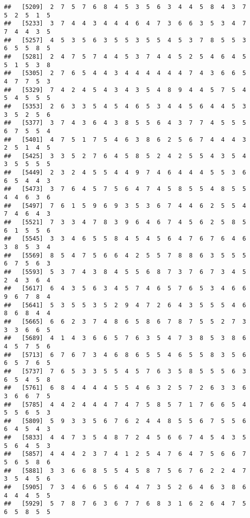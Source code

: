 \documentclass[
]{book}
\begin{document}
\begin{verbatim}
##   [5209]  2  7  5  7  6  8  4  5  3  5  6  3  4  4  5  8  4  3  7  5  2  5  1  5
##   [5233]  3  7  4  4  3  4  4  4  6  4  7  3  6  6  3  5  3  4  7  7  4  4  3  5
##   [5257]  4  5  3  5  6  3  5  5  3  5  5  4  5  3  7  8  5  5  3  6  5  5  8  5
##   [5281]  2  4  7  5  7  4  4  5  3  7  4  4  5  2  5  4  6  4  5  5  1  5  3  8
##   [5305]  2  7  6  5  4  4  3  4  4  4  4  4  4  7  4  3  6  6  5  4  7  7  5  3
##   [5329]  7  4  2  4  5  4  3  4  3  5  4  8  9  4  4  5  7  5  4  5  4  5  5  5
##   [5353]  2  6  3  3  5  4  5  4  6  5  3  4  4  5  6  4  4  5  3  3  5  2  5  6
##   [5377]  3  7  4  3  6  4  3  8  5  5  6  4  3  7  7  4  5  5  5  6  7  5  5  4
##   [5401]  4  7  5  1  7  5  4  6  3  8  6  2  5  6  7  4  4  4  3  2  5  1  4  5
##   [5425]  3  3  5  2  7  6  4  5  8  5  2  4  2  5  5  4  3  5  4  3  5  5  5  5
##   [5449]  2  3  2  4  5  5  4  4  9  7  4  6  4  4  4  5  5  3  6  6  5  4  4  3
##   [5473]  3  7  6  4  5  7  5  6  4  7  4  5  8  5  5  4  8  5  5  4  4  6  3  6
##   [5497]  7  6  1  5  9  6  9  3  5  3  6  7  4  4  6  2  5  5  4  7  4  6  4  3
##   [5521]  7  3  3  4  7  8  3  9  6  4  6  7  4  5  6  2  5  8  5  6  1  5  5  6
##   [5545]  3  3  4  6  5  5  8  4  5  4  5  6  4  7  6  7  6  4  6  3  8  5  3  4
##   [5569]  8  5  4  7  5  6  6  4  2  5  5  7  8  8  6  3  5  5  5  6  7  5  6  3
##   [5593]  5  3  7  4  3  8  4  5  5  6  8  7  3  7  6  7  3  4  5  2  4  3  6  4
##   [5617]  6  4  3  5  6  3  4  5  7  4  6  5  7  6  5  3  4  6  6  9  6  7  8  4
##   [5641]  5  3  5  5  3  5  2  9  4  7  2  6  4  3  5  5  5  4  6  8  6  8  4  4
##   [5665]  6  6  2  3  7  4  8  6  5  8  6  7  8  7  5  5  2  7  3  3  3  6  6  5
##   [5689]  4  1  4  3  6  6  5  7  6  3  5  4  7  3  8  5  3  8  6  4  5  7  5  6
##   [5713]  6  7  6  7  3  4  6  8  6  5  5  4  6  5  5  8  3  5  6  6  5  7  6  5
##   [5737]  7  6  5  3  3  5  5  4  5  7  6  3  5  8  5  5  5  6  3  6  5  4  5  8
##   [5761]  6  8  4  4  4  4  5  5  4  6  3  2  5  7  2  6  3  3  6  3  6  6  7  5
##   [5785]  4  4  2  4  4  4  7  4  7  5  8  5  7  1  7  6  6  5  4  5  5  6  5  3
##   [5809]  5  9  3  3  5  6  7  6  2  4  4  8  5  5  6  7  5  5  6  6  4  5  4  3
##   [5833]  4  4  7  3  5  4  8  7  2  4  5  6  6  7  4  5  4  3  5  5  6  4  5  3
##   [5857]  4  4  4  2  3  7  4  1  2  5  4  7  6  4  7  5  6  6  7  5  6  5  8  6
##   [5881]  3  3  6  6  8  5  5  4  5  8  7  5  6  7  6  2  2  4  7  3  5  4  5  6
##   [5905]  7  3  4  6  6  5  6  4  4  7  3  5  2  6  4  6  3  8  6  4  4  4  5  5
##   [5929]  5  7  8  7  6  3  6  7  7  6  8  3  1  6  2  6  4  7  5  6  5  8  5  5

\end{verbatim}
\end{document}
